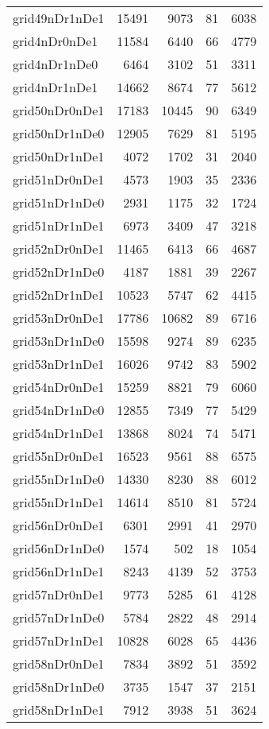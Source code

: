 \begin{longtable}{lrrrr}
grid49nDr1nDe1 & 15491 & 9073 & 81 & 6038 \\
grid4nDr0nDe1 & 11584 & 6440 & 66 & 4779 \\
grid4nDr1nDe0 & 6464 & 3102 & 51 & 3311 \\
grid4nDr1nDe1 & 14662 & 8674 & 77 & 5612 \\
grid50nDr0nDe1 & 17183 & 10445 & 90 & 6349 \\
grid50nDr1nDe0 & 12905 & 7629 & 81 & 5195 \\
grid50nDr1nDe1 & 4072 & 1702 & 31 & 2040 \\
grid51nDr0nDe1 & 4573 & 1903 & 35 & 2336 \\
grid51nDr1nDe0 & 2931 & 1175 & 32 & 1724 \\
grid51nDr1nDe1 & 6973 & 3409 & 47 & 3218 \\
grid52nDr0nDe1 & 11465 & 6413 & 66 & 4687 \\
grid52nDr1nDe0 & 4187 & 1881 & 39 & 2267 \\
grid52nDr1nDe1 & 10523 & 5747 & 62 & 4415 \\
grid53nDr0nDe1 & 17786 & 10682 & 89 & 6716 \\
grid53nDr1nDe0 & 15598 & 9274 & 89 & 6235 \\
grid53nDr1nDe1 & 16026 & 9742 & 83 & 5902 \\
grid54nDr0nDe1 & 15259 & 8821 & 79 & 6060 \\
grid54nDr1nDe0 & 12855 & 7349 & 77 & 5429 \\
grid54nDr1nDe1 & 13868 & 8024 & 74 & 5471 \\
grid55nDr0nDe1 & 16523 & 9561 & 88 & 6575 \\
grid55nDr1nDe0 & 14330 & 8230 & 88 & 6012 \\
grid55nDr1nDe1 & 14614 & 8510 & 81 & 5724 \\
grid56nDr0nDe1 & 6301 & 2991 & 41 & 2970 \\
grid56nDr1nDe0 & 1574 & 502 & 18 & 1054 \\
grid56nDr1nDe1 & 8243 & 4139 & 52 & 3753 \\
grid57nDr0nDe1 & 9773 & 5285 & 61 & 4128 \\
grid57nDr1nDe0 & 5784 & 2822 & 48 & 2914 \\
grid57nDr1nDe1 & 10828 & 6028 & 65 & 4436 \\
grid58nDr0nDe1 & 7834 & 3892 & 51 & 3592 \\
grid58nDr1nDe0 & 3735 & 1547 & 37 & 2151 \\
grid58nDr1nDe1 & 7912 & 3938 & 51 & 3624 \\

\end{longtable}
